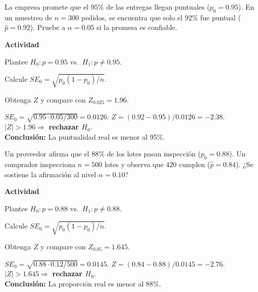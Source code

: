 \begin{ejercicio}[Entregas a tiempo (n=300)]
La empresa promete que el $95\%$ de las entregas llegan puntuales ($p_0=0.95$).
En un muestreo de $n=300$ pedidos, se encuentra que solo el $92\%$ fue puntual ($\hat p=0.92$).
Pruebe a $\alpha=0.05$ si la promesa es confiable.


\textbf{Actividad}
\begin{pasos}
  \item Plantee $H_0: p=0.95$ vs.\ $H_1: p\neq0.95$.
  \item Calcule $SE_0=\sqrt{p_0(1-p_0)/n}$.
  \item Obtenga $Z$ y compare con $Z_{0.025}=1.96$.
\end{pasos}

\begin{clave}
$SE_0=\sqrt{0.95\cdot0.05/300}=0.0126$. \;
$Z=(0.92-0.95)/0.0126=-2.38$. \;
$|Z|>1.96 \Rightarrow$ \textbf{rechazar $H_0$}.\\
\textbf{Conclusión:} La puntualidad real es menor al 95\%.
\end{clave}
\end{ejercicio}


\begin{ejercicio}[Aceptación de lotes en control de calidad (n=500)]
Un proveedor afirma que el $88\%$ de los lotes pasan inspección ($p_0=0.88$).
Un comprador inspecciona $n=500$ lotes y observa que $420$ cumplen ($\hat p=0.84$).
¿Se sostiene la afirmación al nivel $\alpha=0.10$?


\textbf{Actividad}
\begin{pasos}
  \item Plantee $H_0: p=0.88$ vs.\ $H_1: p\neq0.88$.
  \item Calcule $SE_0=\sqrt{p_0(1-p_0)/n}$.
  \item Obtenga $Z$ y compare con $Z_{0.05}=1.645$.
\end{pasos}

\begin{clave}
$SE_0=\sqrt{0.88\cdot0.12/500}=0.0145$. \;
$Z=(0.84-0.88)/0.0145=-2.76$. \;
$|Z|>1.645 \Rightarrow$ \textbf{rechazar $H_0$}.\\
\textbf{Conclusión:} La proporción real es menor al 88\%.
\end{clave}
\end{ejercicio}


